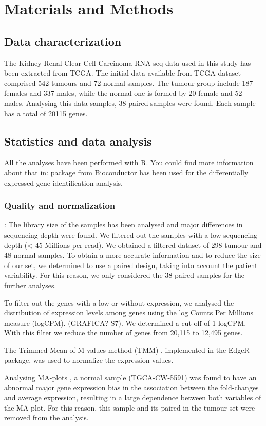 \documentclass[9pt,twocolumn,twoside]{gsajnl}
\begin{document}
\section*{Materials and Methods}
\subsection*{Data characterization}
The Kidney Renal Clear-Cell Carcinoma RNA-seq data used in this study has been extracted from TCGA. The initial data available from TCGA dataset comprised 542 tumours and 72 normal samples. The tumour group include 187 females and 337 males, while the normal one is formed by 20 female and 52 males. Analysing this data samples, 38 paired samples were found. Each sample has a total of 20115 genes. 

\subsection*{Statistics and data analysis}
All the analyses have been performed with R. You could find more information about that in: package from \href{https://bioconductor.org}{Bioconductor} \citep{Gentleman2004} has been used for the differentially expressed gene identification analysis.


\subsubsection*{Quality and normalization }
: The library size of the samples has been analysed and major differences in sequencing depth were found. We filtered out the samples with a low sequencing depth (< 45 Millions per read). We obtained a filtered dataset of 298 tumour and 48 normal samples. To obtain a more accurate information and to reduce the size of our set, we determined to use a paired design, taking into account the patient variability. For this reason, we only considered the 38 paired samples for the further analyses.

To filter out the genes with a low or without expression, we analysed the distribution of expression levels among genes using the log Counts Per Millions measure (logCPM). (GRAFICA? S7). We determined a cut-off of 1 logCPM. With this filter we reduce the number of genes from 20,115 to 12,495 genes.

The Trimmed Mean of M-values method (TMM) \citep{Robinson2010}, implemented in the EdgeR package, was used to normalize the expression values.

Analysing MA-plots \citep{Dudoit2002}, a normal sample (TGCA-CW-5591) was found to have an abnormal major gene expression bias in the association between the fold-changes and average expression, resulting in a large dependence between both variables of the MA plot. For this reason, this sample and its paired in the tumour set were removed from the analysis.
\end{document}
